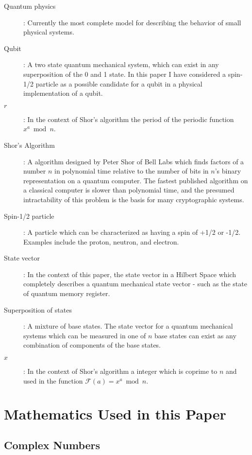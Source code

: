 \documentclass[]{article}
\begin{document}
\begin{description}
\item[Quantum physics]:
	Currently the most complete model for describing the behavior
of small physical systems.

\item[Qubit]:
	A two state quantum mechanical system, which can exist in any
superposition of the 0 and 1 state.  In this paper I have considered a
spin-1/2 particle as a possible candidate for a qubit in a physical
implementation of a qubit.

\item[$r$]:
	In the context of Shor's algorithm the period of the periodic
function $x^{a} \bmod n$.

\item[Shor's Algorithm]: A algorithm designed by Peter Shor of Bell
  Labs which finds factors of a number $n$ in polynomial time relative
  to the number of bits in $n$'s binary representation on a quantum
  computer.  The fastest published algorithm on a classical computer
  is slower than polynomial time, and the presumed intractability of
  this problem is the basis for many cryptographic systems.
	
\item[Spin-1/2 particle]: 
      A particle which can be characterized as
  having a spin of +1/2 or -1/2.  Examples include the proton, neutron, and electron.

\item[State vector]:
	In the context of this paper, the state vector in a Hilbert Space which completely describes a quantum mechanical state vector - such as the state of quantum memory register.

\item[Superposition of states]:
	A mixture of base states.  The state vector for a quantum
mechanical systems which can be measured in one of $n$ base states can
exist as any combination of components of the base states.

\item[$x$]:
	In the context of Shor's algorithm a integer which is coprime
to $n$ and used in the function $\mathcal{F}(a) = x^{a} \bmod n$.

\end{description}

\appendix
\section{Mathematics Used in this Paper}

\subsection{Complex Numbers}
\end{document}
